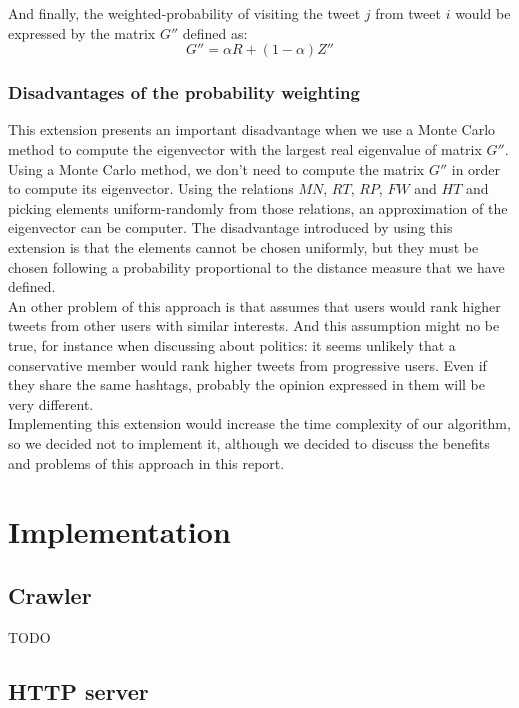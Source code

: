 \documentclass[12pt,a4paper]{article}
\begin{document}
And finally, the weighted-probability of visiting the tweet $j$ from tweet $i$ would be expressed by the matrix $G''$ defined as:
\begin{equation}
G'' = \alpha R + (1 - \alpha) Z''
\end{equation}

\subsubsection*{Disadvantages of the probability weighting}
This extension presents an important disadvantage when we use a Monte Carlo method to compute the eigenvector with the largest real eigenvalue of matrix $G''$. Using a Monte Carlo method, we don't need to compute the matrix $G''$ in order to compute its eigenvector. Using the relations $MN$, $RT$, $RP$, $FW$ and $HT$ and picking elements uniform-randomly from those relations, an approximation of the eigenvector can be computer. The disadvantage introduced by using this extension is that the elements cannot be chosen uniformly, but they must be chosen following a probability proportional to the distance measure that we have defined. \\

An other problem of this approach is that assumes that users would rank higher tweets from other users with similar interests. And this assumption might no be true, for instance when discussing about politics: it seems unlikely that a conservative member would rank higher tweets from progressive users. Even if they share the same hashtags, probably the opinion expressed in them will be very different. \\

Implementing this extension would increase the time complexity of our algorithm, so we decided not to implement it, although we decided to discuss the benefits and problems of this approach in this report.

\section {Implementation}

\subsection{Crawler}
TODO
\subsection{HTTP server}
\end{document}
